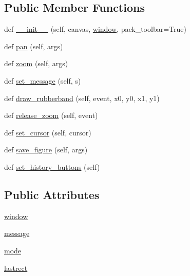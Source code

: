 \subsection*{Public Member Functions}
\begin{DoxyCompactItemize}
\item 
def \hyperlink{classmatplotlib_1_1backends_1_1__backend__tk_1_1NavigationToolbar2Tk_a7afa94dcd10e7282faa36d3e1d35f735}{\+\_\+\+\_\+init\+\_\+\+\_\+} (self, canvas, \hyperlink{classmatplotlib_1_1backends_1_1__backend__tk_1_1NavigationToolbar2Tk_ac2400269fa4ddffda6c46f4fe51737df}{window}, pack\+\_\+toolbar=True)
\item 
def \hyperlink{classmatplotlib_1_1backends_1_1__backend__tk_1_1NavigationToolbar2Tk_a17dcbd91364a5ef0da08f2a6485feac5}{pan} (self, args)
\item 
def \hyperlink{classmatplotlib_1_1backends_1_1__backend__tk_1_1NavigationToolbar2Tk_a18669b849986fd50482c99f913b49c83}{zoom} (self, args)
\item 
def \hyperlink{classmatplotlib_1_1backends_1_1__backend__tk_1_1NavigationToolbar2Tk_a1b1067ccd80632b71396bc23fcf6193c}{set\+\_\+message} (self, s)
\item 
def \hyperlink{classmatplotlib_1_1backends_1_1__backend__tk_1_1NavigationToolbar2Tk_a54be92f7ac024ea9da10e49b8eee6529}{draw\+\_\+rubberband} (self, event, x0, y0, x1, y1)
\item 
def \hyperlink{classmatplotlib_1_1backends_1_1__backend__tk_1_1NavigationToolbar2Tk_a25a34268e0ccc3af0c0877809a790014}{release\+\_\+zoom} (self, event)
\item 
def \hyperlink{classmatplotlib_1_1backends_1_1__backend__tk_1_1NavigationToolbar2Tk_ad8020a19fe57b9e640f9637e1d44f29e}{set\+\_\+cursor} (self, cursor)
\item 
def \hyperlink{classmatplotlib_1_1backends_1_1__backend__tk_1_1NavigationToolbar2Tk_a4d7aa55ecd060d00fa7b06f03e5f53e4}{save\+\_\+figure} (self, args)
\item 
def \hyperlink{classmatplotlib_1_1backends_1_1__backend__tk_1_1NavigationToolbar2Tk_a9ca7aaee914f1fd8dc2c2685d65f0bce}{set\+\_\+history\+\_\+buttons} (self)
\end{DoxyCompactItemize}
\subsection*{Public Attributes}
\begin{DoxyCompactItemize}
\item 
\hyperlink{classmatplotlib_1_1backends_1_1__backend__tk_1_1NavigationToolbar2Tk_ac2400269fa4ddffda6c46f4fe51737df}{window}
\item 
\hyperlink{classmatplotlib_1_1backends_1_1__backend__tk_1_1NavigationToolbar2Tk_aba48618c61b6958db4bbc0dde14e1e87}{message}
\item 
\hyperlink{classmatplotlib_1_1backends_1_1__backend__tk_1_1NavigationToolbar2Tk_a49e11c736172204cba9ac8bf3f3bb4e0}{mode}
\item 
\hyperlink{classmatplotlib_1_1backends_1_1__backend__tk_1_1NavigationToolbar2Tk_ab38f73f2380b861c0322fd18ca2f12e9}{lastrect}
\end{DoxyCompactItemize}


